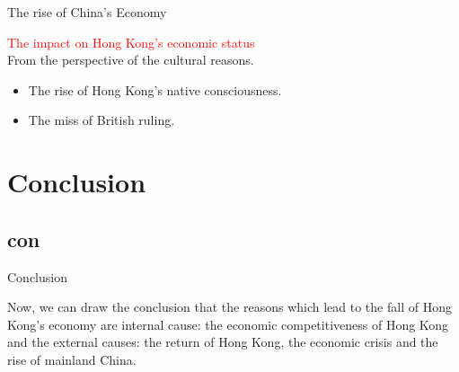 \documentclass[slidestop,uncompress,mathsans, 12pt]{beamer}
\begin{document}
\begin{frame}{The rise of China's Economy}

\textcolor{red}{The impact on Hong Kong's economic status}\\
\bigskip
From the perspective of the cultural reasons.\\
\bigskip
\begin{itemize}
\item The rise of Hong Kong’s native consciousness.
\bigskip
\item The miss of British ruling.
\end{itemize}


\end{frame}

\section{Conclusion}
\subsection{con}
\begin{frame}{Conclusion}

\bigskip
\bigskip

\begin{block}{}
Now, we can draw the conclusion that the reasons which lead to the fall of Hong Kong's economy are internal cause: \alert{the economic competitiveness of Hong Kong}  
and the external causes: \alert{the return of Hong Kong, the economic crisis and the rise of mainland China}.
\end{block}
\end{frame}
\begin{frame}
\bigskip
\bigskip
\bigskip
\bigskip
\bigskip
\bigskip
\bigskip


\\ 
\end{frame}
\end{document}
